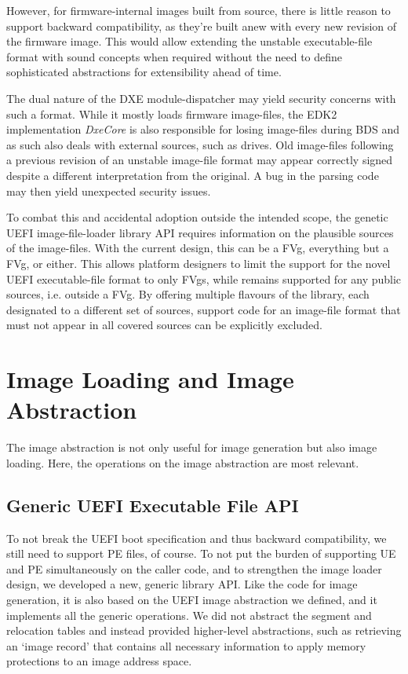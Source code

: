 However, for \gls{firmware}-internal images built from source, there is little reason to support backward compatibility, as they're built anew with every new revision of the \gls{firmware} image. This would allow extending the unstable \gls{executable-file} format with sound concepts when required without the need to define sophisticated abstractions for extensibility ahead of time.

The dual nature of the \gls{DXE} \gls{module-dispatcher} may yield security concerns with such a format. While it mostly loads \gls{firmware} \glspl{image-file}, the \gls{EDK2} implementation \textit{DxeCore} is also responsible for losing \glspl{image-file} during \gls{BDS} and as such also deals with external sources, such as drives. Old \glspl{image-file} following a previous revision of an unstable \gls{image-file} format may appear correctly signed despite a different interpretation from the original. A bug in the parsing code may then yield unexpected security issues.

To combat this and accidental adoption outside the intended scope, the genetic \gls{UEFI} \gls{image-file-loader} library API requires information on the plausible sources of the \glspl{image-file}. With the current design, this can be a \gls{FVg}, everything but a \gls{FVg}, or either. This allows platform designers to limit the support for the novel \gls{UEFI} \gls{executable-file} format to only \glspl{FVg}, while  remains supported for any public sources, i.e. outside a \gls{FVg}. By offering multiple flavours of the library, each designated to a different set of sources, support code for an \gls{image-file} format that must not appear in all covered sources can be explicitly excluded.

\section{Image Loading and Image Abstraction}

The \gls{image} abstraction is not only useful for \gls{image} generation but also \gls{image} loading. Here, the operations on the \gls{image} abstraction are most relevant.

\subsection{Generic UEFI Executable File API}

To not break the UEFI boot specification and thus backward compatibility, we still need to support PE files, of course. To not put the burden of supporting UE and PE simultaneously on the caller code, and to strengthen the image loader design, we developed a new, generic library API. Like the code for image generation, it is also based on the UEFI image abstraction we defined, and it implements all the generic operations. We did not abstract the segment and relocation tables and instead provided higher-level abstractions, such as retrieving an `image record' that contains all necessary information to apply memory protections to an image address space.

